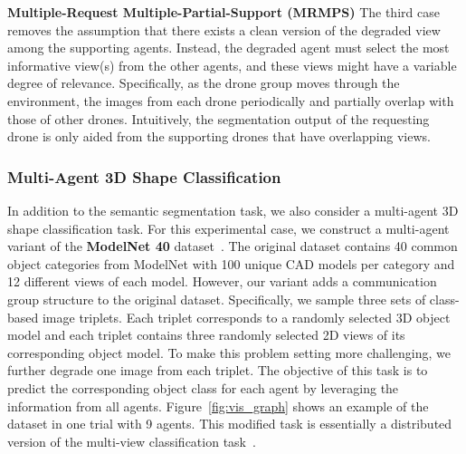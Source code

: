 \noindent
\textbf{Multiple-Request Multiple-Partial-Support (MRMPS)}
The third case removes the assumption that there exists a clean version of the degraded view among the supporting agents.  Instead, the degraded agent must select the most informative view(s) from the other agents, and these views might have a variable degree of relevance.  Specifically, as the drone group moves through the environment, the images from each drone periodically and partially overlap with those of other drones.  Intuitively, the segmentation output of the requesting drone is only aided from the supporting drones that have overlapping views. 



\subsubsection{Multi-Agent 3D Shape Classification}
In addition to the semantic segmentation task, we also consider a multi-agent 3D shape classification task.  
For this experimental case, we construct a multi-agent variant of the \textbf{ModelNet 40} dataset~\cite{wu20153d}. 
The original dataset contains 40 common object categories from ModelNet with 100 unique CAD models per category and 12 different views of each model.  
However, our variant adds a communication group structure to the original dataset.  Specifically, we sample three sets of class-based image triplets.  
Each triplet corresponds to a randomly selected 3D object model and each triplet contains three randomly selected 2D views of its corresponding object model.  
To make this problem setting more challenging, we further degrade one image from each triplet. 
The objective of this task is to predict the corresponding object class for each agent by leveraging the information from all agents. 
Figure~\ref{fig:vis_graph} shows an example of the dataset in one trial with 9 agents.
This modified task is essentially a distributed version of the multi-view classification task~\cite{wu20153d}.

